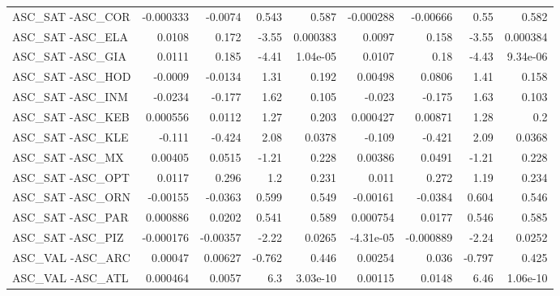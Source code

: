 \begin{tabular}{lrrrrrrrr}
ASC\_SAT -ASC\_COR                       &   -0.000333 &      -0.0074 &   0.543 &    0.587 &  -0.000288 &    -0.00666 &         0.55 &         0.582 \\
ASC\_SAT -ASC\_ELA                       &      0.0108 &        0.172 &   -3.55 & 0.000383 &     0.0097 &       0.158 &        -3.55 &      0.000384 \\
ASC\_SAT -ASC\_GIA                       &      0.0111 &        0.185 &   -4.41 & 1.04e-05 &     0.0107 &        0.18 &        -4.43 &      9.34e-06 \\
ASC\_SAT -ASC\_HOD                       &     -0.0009 &      -0.0134 &    1.31 &    0.192 &    0.00498 &      0.0806 &         1.41 &         0.158 \\
ASC\_SAT -ASC\_INM                       &     -0.0234 &       -0.177 &    1.62 &    0.105 &     -0.023 &      -0.175 &         1.63 &         0.103 \\
ASC\_SAT -ASC\_KEB                       &    0.000556 &       0.0112 &    1.27 &    0.203 &   0.000427 &     0.00871 &         1.28 &           0.2 \\
ASC\_SAT -ASC\_KLE                       &      -0.111 &       -0.424 &    2.08 &   0.0378 &     -0.109 &      -0.421 &         2.09 &        0.0368 \\
ASC\_SAT -ASC\_MX                        &     0.00405 &       0.0515 &   -1.21 &    0.228 &    0.00386 &      0.0491 &        -1.21 &         0.228 \\
ASC\_SAT -ASC\_OPT                       &      0.0117 &        0.296 &     1.2 &    0.231 &      0.011 &       0.272 &         1.19 &         0.234 \\
ASC\_SAT -ASC\_ORN                       &    -0.00155 &      -0.0363 &   0.599 &    0.549 &   -0.00161 &     -0.0384 &        0.604 &         0.546 \\
ASC\_SAT -ASC\_PAR                       &    0.000886 &       0.0202 &   0.541 &    0.589 &   0.000754 &      0.0177 &        0.546 &         0.585 \\
ASC\_SAT -ASC\_PIZ                       &   -0.000176 &     -0.00357 &   -2.22 &   0.0265 &  -4.31e-05 &   -0.000889 &        -2.24 &        0.0252 \\
ASC\_VAL -ASC\_ARC                       &     0.00047 &      0.00627 &  -0.762 &    0.446 &    0.00254 &       0.036 &       -0.797 &         0.425 \\
ASC\_VAL -ASC\_ATL                       &    0.000464 &       0.0057 &     6.3 & 3.03e-10 &    0.00115 &      0.0148 &         6.46 &      1.06e-10 \\

\end{tabular}
